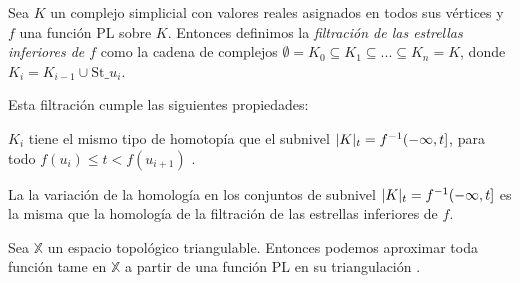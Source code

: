 \begin{definition}
Sea $K$ un complejo simplicial con valores reales asignados en todos sus vértices y $f$ una función PL sobre $K$. Entonces definimos la \emph{filtración de las estrellas inferiores de $f$} como la cadena de complejos $\emptyset = K_0 \subseteq K_1 \subseteq ... \subseteq K_n = K$, donde $K_i=K_{i-1} \cup \text{St}\_u_i$. 
\end{definition}

Esta filtración cumple las siguientes propiedades:
\begin{property}
$K_i$ tiene el mismo tipo de homotopía que el subnivel $\lvert K\rvert_t=f^{-1}(-\infty, t]$, para todo $f(u_i) \leq t < f(u_{i+1})$ \cite{libroEH}.
\end{property}

\begin{property}
\begin{sloppypar}
La la variación de la homología en los conjuntos de subnivel ${\lvert K\rvert_t=f^{-1}(-\infty, t]}$ es la misma que la homología de la filtración de las estrellas inferiores de $f$.
\end{sloppypar}
\end{property}

\begin{property}
Sea $\mathbb{X}$ un espacio topológico triangulable. Entonces podemos aproximar toda función tame en $\mathbb{X}$ a partir de una función PL en su triangulación \cite{articuloPersistenciaEH}.
\end{property}




